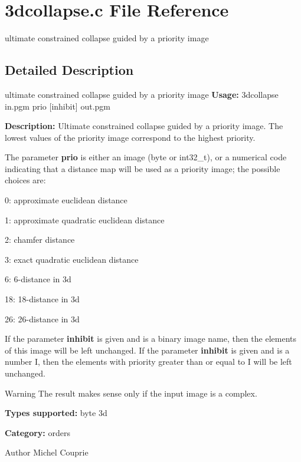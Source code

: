 \section{3dcollapse.c File Reference}
\label{3dcollapse_8c}


ultimate constrained collapse guided by a priority image  




\subsection{Detailed Description}
ultimate constrained collapse guided by a priority image {\bfseries Usage:} 3dcollapse in.pgm prio [inhibit] out.pgm

{\bfseries Description:} Ultimate constrained collapse guided by a priority image. The lowest values of the priority image correspond to the highest priority.

The parameter {\bfseries prio} is either an image (byte or int32\_\-t), or a numerical code indicating that a distance map will be used as a priority image; the possible choices are: \begin{DoxyItemize}
\item 0: approximate euclidean distance \item 1: approximate quadratic euclidean distance \item 2: chamfer distance \item 3: exact quadratic euclidean distance \item 6: 6-\/distance in 3d \item 18: 18-\/distance in 3d \item 26: 26-\/distance in 3d\end{DoxyItemize}
If the parameter {\bfseries inhibit} is given and is a binary image name, then the elements of this image will be left unchanged. If the parameter {\bfseries inhibit} is given and is a number I, then the elements with priority greater than or equal to I will be left unchanged.

\begin{DoxyWarning}{Warning}
The result makes sense only if the input image is a complex.
\end{DoxyWarning}
{\bfseries Types supported:} byte 3d

{\bfseries Category:} orders

\begin{DoxyAuthor}{Author}
Michel Couprie 
\end{DoxyAuthor}
